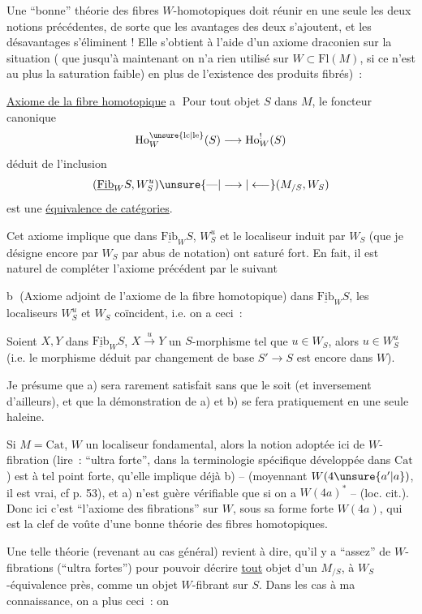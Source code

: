 Une ``bonne'' théorie des fibres $W$-homotopiques doit réunir en une seule les deux notions précédentes, de sorte que les avantages des deux s'ajoutent, et les désavantages s'éliminent ! Elle s'obtient à l'aide d'un axiome draconien sur la situation ( que jusqu'à maintenant on n'a rien utilisé sur $W\subset\mathrm{Fl}(M)$, si ce n'est  au plus la saturation faible) \unsure{,|;} en plus de l'existence des produits fibrés)~:

\uline{Axiome de la fibre homotopique} \textcircled{a} Pour tout objet $S$ dans $M$, le foncteur canonique
\[
\mathrm{Ho}^{\unsure{\mathrm{lc}|\mathrm{le}}}_W(S)\longrightarrow\mathrm{Ho}^{!}_W(S)
\]
déduit de l'inclusion
\[
(\underline{\mathrm{Fib}}_W S,W_S^u)\unsure{\text{---}|\longrightarrow|\longleftarrow}(M_{/S},W_S)
\]
est une \uline{équivalence de catégories}.

Cet axiome implique que dans $\underline{\mathrm{Fib}}_W S$, $W_S^u$ et le localiseur induit par $W_S$ (que je désigne encore par $W_S$ par abus de notation) ont  saturé fort. En fait,  il est naturel de compléter l'axiome précédent par le suivant

\textcircled{b} (Axiome adjoint de l'axiome de la fibre homotopique) dans $\underline{\mathrm{Fib}}_W S$, les localiseurs $W_S^u$ et $W_S$ coïncident, i.e. on a ceci~:

Soient $X,Y$ dans $\underline{\mathrm{Fib}}_W S$, $X\xrightarrow{u}Y$ un $S$-morphisme tel que $u\in W_S$, alors $u\in W_S^u$ (i.e. le morphisme  déduit par  changement de base $S'\to S$ est encore dans $W$).

Je présume que a) sera rarement satisfait sans que  le soit (et inversement d'ailleurs), et que la démonstration de a) et b) se fera pratiquement en une seule haleine.

Si $M=\mathrm{Cat}$, $W$ un localiseur fondamental, alors la  notion adoptée ici de $W$-fibration (lire~: ``ultra forte'', dans la terminologie spécifique développée dans $\mathrm{Cat}$) est à tel point forte, qu'elle implique déjà  b) -- (moyennant $W(4\unsure{a'|a})$, il est vrai, cf p. 53), et a) n'est guère vérifiable que si on a $W(4a)^{*}$ --
(loc. cit.). Donc ici c'est ``l'axiome des fibrations'' sur $W$, sous sa forme forte $W(4a)$, qui est la clef de voûte d'une bonne théorie des fibres homotopiques.

Une telle théorie (revenant au cas général) revient à dire,  qu'il y a ``assez'' de $W$-fibrations (``ultra fortes'') pour pouvoir décrire \uline{tout} objet d'un $M_{/S}$, à $W_S$-équivalence près, comme un objet $W$-fibrant sur $S$. Dans  les cas à ma connaissance, on a  plus ceci~: on
